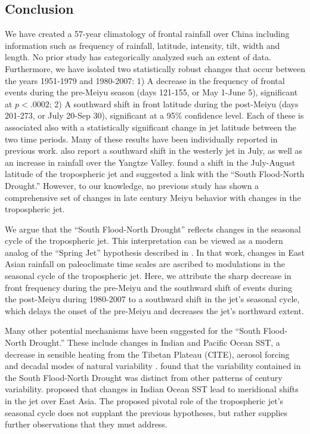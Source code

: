 \documentclass[draft,grl]{AGUTeX}
\begin{document}
\begin{article}
\section{Conclusion}

	We have created a 57-year climatology of frontal rainfall over China including information such as frequency of rainfall, latitude, intensity, tilt, width and length. No prior study has categorically analyzed such an extent of data. Furthermore, we have isolated two statistically robust changes that occur between the years 1951-1979 and 1980-2007: 1) A decrease in the frequency of frontal events during the pre-Meiyu season (days 121-155, or May 1-June 5), significant at $p < .0002$; 2) A southward shift in front latitude during the post-Meiyu (days 201-273, or July 20-Sep 30), significant at a 95\% confidence level. Each of these is associated also with a statistically significant change in jet latitude between the two time periods. Many of these results have been individually reported in previous work. \citet{Xuan2011} also report a southward shift in the westerly jet in July, as well as an increase in rainfall over the Yangtze Valley. \citet{Yu2004} found a shift in the July-August latitude of the tropospheric jet and suggested a link with the ``South Flood-North Drought.'' However, to our knowledge, no previous study has shown a comprehensive set of changes in late  century Meiyu behavior with changes in the tropospheric jet.

	We argue that the ``South Flood-North Drought'' reflects changes in the seasonal cycle of the tropospheric jet. This interpretation can be viewed as a modern analog of the ``Spring Jet'' hypothesis described in \citet{Chiang2015}. In that work, changes in East Asian rainfall on paleoclimate time scales are ascribed to modulations in the seasonal cycle of the tropospheric jet. Here, we attribute the sharp decrease in front frequency during the pre-Meiyu and the southward shift of events during the post-Meiyu during 1980-2007 to a southward shift in the jet's seasonal cycle, which delays the onset of the pre-Meiyu and decreases the jet's northward extent.

	Many other potential mechanisms have been suggested for the ``South Flood-North Drought.'' These include changes in Indian and Pacific Ocean SST,  a decrease in sensible heating from the Tibetan Plateau (CITE), aerosol forcing \citep{Song2014} and decadal modes of natural variability \citep{Zhang1999,Xin2006,Lei2014}. \cite{Zhou2009} found that the variability contained in the South Flood-North Drought was distinct from other patterns of  century variability. \citet{Qu2012} proposed that changes in Indian Ocean SST lead to meridional shifts in the jet over East Asia. The proposed pivotal role of the tropospheric jet's seasonal cycle does not supplant the previous hypotheses, but rather supplies further observations that they must address.
	

\end{article}
\end{document}
